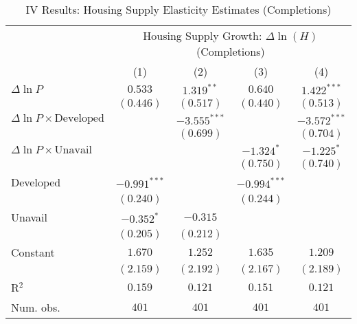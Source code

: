 
\begin{table}
\caption{IV Results: Housing Supply Elasticity Estimates (Completions)}
\begin{center}
\begin{normalsize}
\begin{threeparttable}
\begin{tabular}{l@{} c@{} c@{} c@{} c@{}}
\toprule
 & \multicolumn{4}{c}{Housing Supply Growth: $\Delta\ln(H)$ (Completions)} \\
\cmidrule(lr){2-5}
 & (1) & (2) & (3) & (4) \\
\midrule
$\Delta\ln P$                         & $0.533$        & $1.319^{**}$   & $0.640$        & $1.422^{***}$  \\
                                      & $(0.446)$      & $(0.517)$      & $(0.440)$      & $(0.513)$      \\
$\Delta\ln P\times{\text{Developed}}$ &                & $-3.555^{***}$ &                & $-3.572^{***}$ \\
                                      &                & $(0.699)$      &                & $(0.704)$      \\
$\Delta\ln P\times{\text{Unavail}}$   &                &                & $-1.324^{*}$   & $-1.225^{*}$   \\
                                      &                &                & $(0.750)$      & $(0.740)$      \\
Developed                             & $-0.991^{***}$ &                & $-0.994^{***}$ &                \\
                                      & $(0.240)$      &                & $(0.244)$      &                \\
Unavail                               & $-0.352^{*}$   & $-0.315$       &                &                \\
                                      & $(0.205)$      & $(0.212)$      &                &                \\
Constant                              & $1.670$        & $1.252$        & $1.635$        & $1.209$        \\
                                      & $(2.159)$      & $(2.192)$      & $(2.167)$      & $(2.189)$      \\
\midrule
R$^2$                                 & $0.159$        & $0.121$        & $0.151$        & $0.121$        \\
Num. obs.                             & $401$          & $401$          & $401$          & $401$          \\

\end{tabular}
\end{threeparttable}
\end{normalsize}
\end{center}
\end{table}
